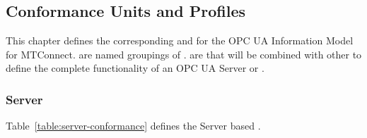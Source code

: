 \subsection{Conformance Units and Profiles}

This chapter defines the corresponding  and  for the OPC UA Information Model for MTConnect.  are named groupings of .  are  that will be combined with other  to define the complete functionality of an OPC UA \gls{Server} or .

\subsubsection{Server}

Table~\ref{table:server-conformance} defines the \gls{Server} based .

